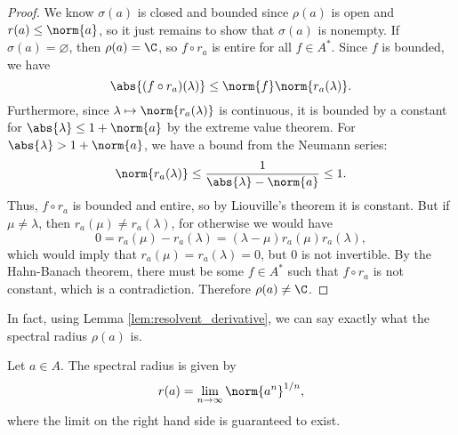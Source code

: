 \begin{proof}
We know $\sigma(a)$ is closed and bounded since $\rho(a)$ is open and $r(a) \leq \norm{a}$, so it just remains to show that $\sigma(a)$ is nonempty. If $\sigma(a) = \varnothing$, then $\rho(a) = \C$, so $f \circ r_a$ is entire for all $f \in A^*$. Since $f$ is bounded, we have
\begin{equation}
\abs{(f \circ r_a)(\lambda)} \leq \norm{f} \norm{r_a(\lambda)}.
\end{equation}
Furthermore, since $\lambda \mapsto \norm{r_a(\lambda)}$ is continuous, it is bounded by a constant for $\abs{\lambda} \leq 1 + \norm{a}$ by the extreme value theorem. For $\abs{\lambda} > 1 + \norm{a}$, we have a bound from the Neumann series:
\begin{equation}
\norm{r_a(\lambda)} \leq \frac{1}{\abs{\lambda} - \norm{a}} \leq 1.
\end{equation}
Thus, $f \circ r_a$ is bounded and entire, so by Liouville's theorem it is constant. But if $\mu \neq \lambda$, then $r_a(\mu) \neq r_a(\lambda)$, for otherwise we would have
\begin{equation}
0 = r_a(\mu) - r_a(\lambda) = (\lambda - \mu)r_a(\mu)r_a(\lambda),
\end{equation}
which would imply that $r_a(\mu) = r_a(\lambda) = 0$, but $0$ is not invertible. By the Hahn-Banach theorem, there must be some $f \in A^*$ such that $f \circ r_a$ is not constant, which is a contradiction. Therefore $\rho(a) \neq \C$.
\end{proof}

In fact, using Lemma \ref{lem:resolvent_derivative}, we can say exactly what the spectral radius $\rho(a)$ is.

\begin{theorem}\label{thm:spectral_radius_formula}
Let $a \in A$. The spectral radius is given by
\begin{equation}
r(a) = \lim_{n \rightarrow \infty} \norm{a^n}^{1/n},
\end{equation}
where the limit on the right hand side is guaranteed to exist.
\end{theorem}

